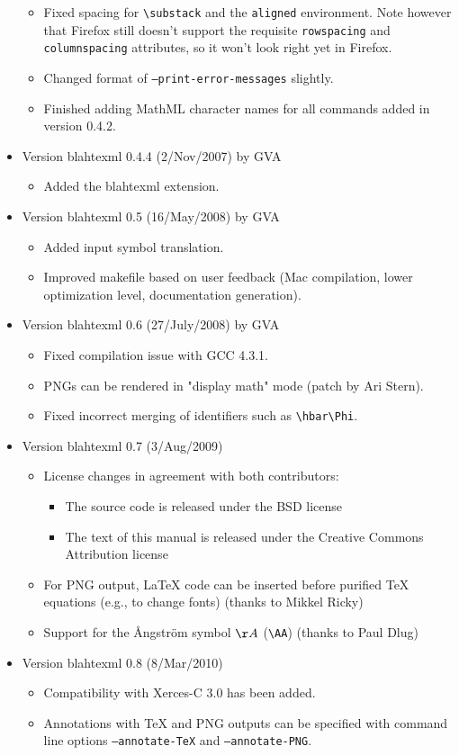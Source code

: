 \documentclass{article}
\newcommand{\texcommand}[1]{\textbackslash{}#1}
\begin{document}
\begin{itemize}
\begin{itemize}
\item Fixed spacing for \texttt{\texcommand{substack}} and the \texttt{aligned} environment. Note however that Firefox still doesn't support the requisite \texttt{rowspacing} and \texttt{columnspacing} attributes, so it won't look right yet in Firefox.
\item Changed format of \texttt{--print-error-messages} slightly.
\item Finished adding MathML character names for all commands added in version 0.4.2.
\end{itemize}
\item Version blahtexml 0.4.4 (2/Nov/2007) by GVA
\begin{itemize}
\item Added the blahtexml extension.
\end{itemize}
\item Version blahtexml 0.5 (16/May/2008) by GVA
\begin{itemize}
\item Added input symbol translation.
\item Improved makefile based on user feedback (Mac compilation, lower optimization level, documentation generation).
\end{itemize}
\item Version blahtexml 0.6 (27/July/2008) by GVA
\begin{itemize}
\item Fixed compilation issue with GCC 4.3.1.
\item PNGs can be rendered in "display math" mode (patch by Ari Stern).
\item Fixed incorrect merging of identifiers such as \verb|\hbar\Phi|.
\end{itemize}
\item Version blahtexml 0.7 (3/Aug/2009)
\begin{itemize}
\item License changes in agreement with both contributors:
\begin{itemize}
\item The source code is released under the BSD license
\item The text of this manual is released under the Creative Commons Attribution license
\end{itemize}
\item For PNG output, LaTeX code can be inserted before purified TeX equations (e.g., to change fonts) (thanks to Mikkel Ricky)
\item Support for the Ångström symbol $\AA$ (\verb|\AA|) (thanks to Paul Dlug)
\end{itemize}
\item Version blahtexml 0.8 (8/Mar/2010)
\begin{itemize}
\item Compatibility with Xerces-C 3.0 has been added.
\item Annotations with TeX and PNG outputs can be specified with command line options \texttt{--annotate-TeX} and \texttt{--annotate-PNG}.
\end{itemize}
\end{itemize}
\end{document}
